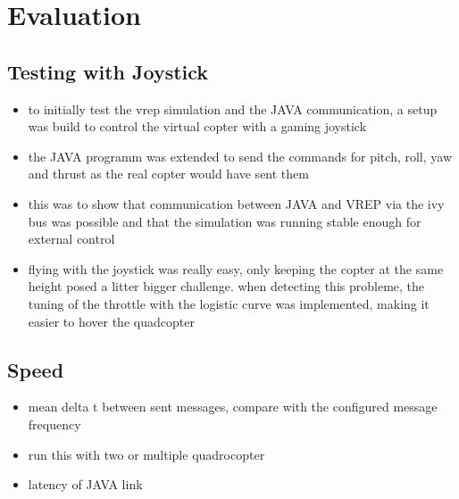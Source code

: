 \chapter{Evaluation}
\label{sec:eval}

\section{Testing with Joystick}
 \begin{itemize}
\item{to initially test the vrep simulation and the JAVA communication, a setup was build to control the virtual copter with a gaming joystick}
\item{the JAVA programm was extended to send the commands for pitch, roll, yaw and thrust as the real copter would have sent them}
\item{this was to show that communication between JAVA and VREP via the ivy bus was possible and that the simulation was running stable enough for external control}
\item{flying with the joystick was really easy, only keeping the copter at the same height posed a litter bigger challenge. when detecting this probleme, the tuning of the throttle with the logistic curve was implemented, making it easier to hover the quadcopter}
\end{itemize}

\section{Speed}


\begin{itemize}

\item{mean delta t between sent messages, compare with the configured message frequency}
\item{ run this with two or multiple quadrocopter}
\item{latency of JAVA link}
\end{itemize}




